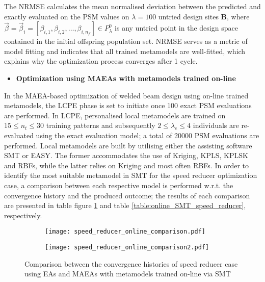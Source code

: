 The NRMSE calculates the mean normalised deviation between the 
predicted and exactly evaluated on the PSM values on $λ=100$ 
untried design sites $\mathbf{Β}$, where $\vec{β} \!= \!
\vec{β}_{i} \!= \![β_{i,1}, β_{i,2}, \hdots, β_{i,n_{β}}] \in 
P_{λ}^{0}$ is any untried point in the design space contained in 
the initial offspring population set. NRMSE serves as a metric of 
model fitting and indicates that all trained metamodels are 
well-fitted, which explains why the optimization process converges 
after 1 cycle.

\newpage

\begin{itemize}
\item \textbf{Optimization using MAEAs with metamodels trained 
on-line}
\end{itemize}

In the MAEA-based optimization of welded beam design using on-line 
trained metamodels, the LCPE phase is set to initiate once 100 
exact PSM evaluations are performed. In LCPE, personalised local
metamodels are trained on $15 \leq n_{t} \leq 30$ training 
patterns and subsequently  $2 \leq λ_{e} \leq 4$ individuals
are re-evaluated using the exact evaluation model; a total of 
20000 PSM evaluations are performed. Local metamodels are built 
by utilising either the assisting software SMT or EASY. The former 
accommodates the use of Kriging, KPLS, KPLSK and RBFs, while the 
latter relies on Kriging and most often RBFs. In order to identify 
the most suitable metamodel in SMT for the speed reducer 
optimization case, a comparison between each respective model 
is performed w.r.t. the convergence history and the produced 
outcome; the results of each comparison are presented in table 
figure \ref{fig:SMT_models_speed_reducer} and table  
\ref{table:online_SMT_speed_reducer}, respectively.

\begin{figure}[h!]
\centering
	\begin{subfigure}[b]{0.49\textwidth}
	\centering
	\texttt{[image: speed\_reducer\_online\_comparison.pdf]}   
	\end{subfigure}
	\hfill
	\begin{subfigure}[b]{0.49\textwidth}
	\centering
	\texttt{[image: speed\_reducer\_online\_comparison2.pdf]}   
	\end{subfigure}
\caption{Comparison between the convergence histories of speed 
reducer case using EAs and MAEAs with metamodels trained on-line 
via SMT} 
\label{fig:SMT_models_speed_reducer}
\end{figure}


